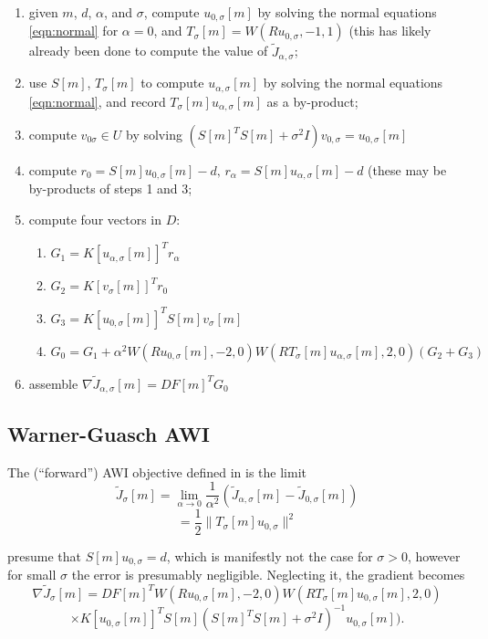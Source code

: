 \begin{enumerate}
\item given $m$, $d$, $\alpha$, and $\sigma$, compute
  $u_{0,\sigma}[m]$ by solving the normal equations \ref{eqn:normal}
  for $\alpha=0$, and $T_{\sigma}[m]=W(Ru_{0,\sigma},-1,1)$ (this has
  likely already been done to compute the value of $\tilde{J}_{\alpha,\sigma}$;
\item use $S[m]$, $T_{\sigma}[m]$ to compute $u_{\alpha,\sigma}[m]$ by
  solving the normal equations \ref{eqn:normal}, and record
  $T_{\sigma}[m]u_{\alpha,\sigma}[m]$ as a by-product;
\item compute $v_{0\sigma} \in U$ by solving $(S[m]^TS[m] + \sigma^2 I)v_{0,\sigma} = u_{0,\sigma}[m]$
\item compute $r_0 = S[m]u_{0,\sigma}[m]-d,\,r_{\alpha} = S[m]u_{\alpha,\sigma}[m]-d$ (these may be by-products of steps 1 and 3;
\item compute four vectors in $D$:
  \begin{enumerate}
  \item $G_1 = K[u_{\alpha,\sigma}[m]]^T r_{\alpha}$
  \item $G_2 = K[v_{\sigma}[m]]^Tr_0$
  \item $G_3 = K[u_{0,\sigma}[m]]^T S[m]v_{\sigma}[m]$
  \item $G_0 = G_1 + \alpha^2  W(Ru_{0,\sigma}[m],-2,0)W(RT_{\sigma}[m]u_{\alpha,\sigma}[m],2,0) (G_2 + G_3)$
  \end{enumerate}
\item assemble
  $\nabla \tilde{J}_{\alpha,\sigma}[m] = DF[m]^TG_0$
\end{enumerate}

\subsection{Warner-Guasch AWI}
The (``forward'') AWI objective defined in \cite{Warner:16} is
the limit
\[
  \tilde{J}_{\sigma}[m] = \lim_{\alpha \rightarrow 0}
  \frac{1}{\alpha^2}(\tilde{J}_{\alpha,\sigma}[m]-\tilde{J}_{0,\sigma}[m])
\]
\begin{equation}
  \label{eqn:wg}
  = \frac{1}{2} \|T_{\sigma}[m]u_{0,\sigma}\|^2
\end{equation}

\cite{Warner:16} presume that $S[m]u_{0,\sigma} = d$, which is
manifestly not the case for $\sigma > 0$, however for small $\sigma$
the error is presumably negligible. Neglecting it, the gradient becomes
\[
  \nabla \tilde{J}_{\sigma}[m] = DF[m]^T
    W(Ru_{0,\sigma}[m],-2,0)W(RT_{\sigma}[m]u_{0,\sigma}[m],2,0)
\]
\begin{equation}
  \label{eqn:wggrad}
\times K[u_{0,\sigma}[m]]^T S[m](S[m]^TS[m] + \sigma^2I)^{-1}u_{0,\sigma}[m]).
\end{equation}


